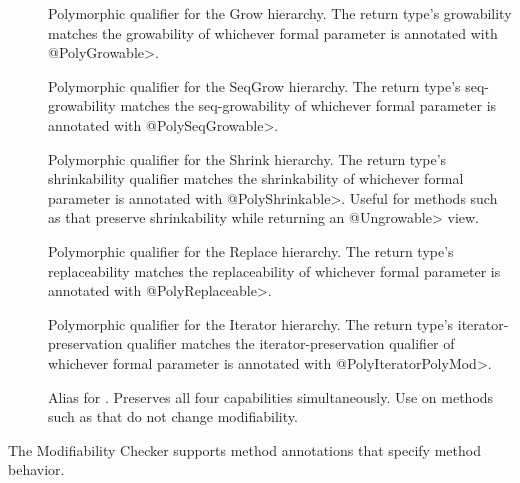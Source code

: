 \begin{description}

\item[]
Polymorphic qualifier for the Grow hierarchy.
The return type's growability matches the growability of whichever
formal parameter is annotated with \<@PolyGrowable>.

\item[]
Polymorphic qualifier for the SeqGrow hierarchy.
The return type's seq-growability matches the seq-growability of
whichever formal parameter is annotated with \<@PolySeqGrowable>.

\item[]
Polymorphic qualifier for the Shrink hierarchy.
The return type's shrinkability qualifier matches the shrinkability of
whichever formal parameter is annotated with \<@PolyShrinkable>.
Useful for methods such as  that preserve shrinkability while
returning an \<@Ungrowable> view.

\item[]
Polymorphic qualifier for the Replace hierarchy.
The return type's replaceability matches the replaceability of
whichever formal parameter is annotated with \<@PolyReplaceable>.

\item[]
Polymorphic qualifier for the Iterator hierarchy.
The return type's iterator-preservation qualifier matches the
iterator-preservation qualifier of whichever formal parameter is annotated
with \<@PolyIteratorPolyMod>.

\item[]
Alias for .
Preserves all four capabilities simultaneously.
Use on methods such as  that
do not change modifiability.

\end{description}



The Modifiability Checker supports method annotations that specify method
behavior.

